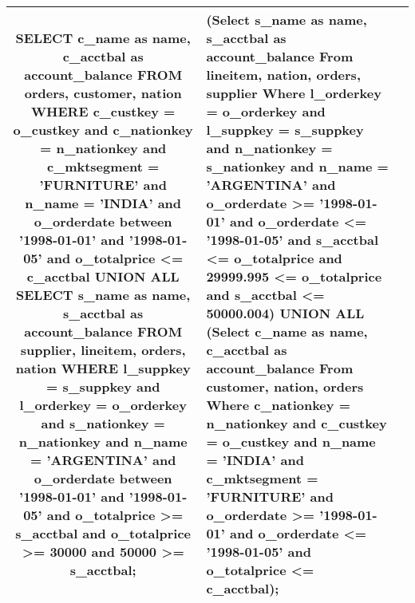 \begin{center}
\begin{supertabular}{|c|p{7cm}|p{7cm}|}
\footnotesize{SELECT c\_name as name, c\_acctbal as account\_balance FROM orders, customer, nation WHERE c\_custkey = o\_custkey and c\_nationkey = n\_nationkey and c\_mktsegment = 'FURNITURE' and n\_name = 'INDIA' and o\_orderdate between '1998-01-01' and '1998-01-05' and o\_totalprice <= c\_acctbal  UNION ALL  SELECT s\_name as name, s\_acctbal as account\_balance FROM supplier, lineitem, orders, nation WHERE l\_suppkey = s\_suppkey and l\_orderkey = o\_orderkey and s\_nationkey = n\_nationkey and n\_name = 'ARGENTINA' and o\_orderdate between '1998-01-01' and '1998-01-05' and o\_totalprice >= s\_acctbal and o\_totalprice >= 30000 and 50000 >= s\_acctbal;} &
\footnotesize{(Select s\_name as name, s\_acctbal as account\_balance  From lineitem, nation, orders, supplier   Where l\_orderkey = o\_orderkey  and l\_suppkey = s\_suppkey  and n\_nationkey = s\_nationkey  and n\_name = 'ARGENTINA'  and o\_orderdate  >= '1998-01-01' and o\_orderdate <= '1998-01-05'  and s\_acctbal <= o\_totalprice  and 29999.995 <= o\_totalprice  and s\_acctbal <= 50000.004)  UNION ALL  (Select c\_name as name, c\_acctbal as account\_balance  From customer, nation, orders   Where c\_nationkey = n\_nationkey  and c\_custkey = o\_custkey  and n\_name = 'INDIA'  and c\_mktsegment = 'FURNITURE'  and o\_orderdate  >= '1998-01-01' and o\_orderdate <= '1998-01-05'  and o\_totalprice <= c\_acctbal);} \\\hline\end{supertabular}
\end{center}
\twocolumn